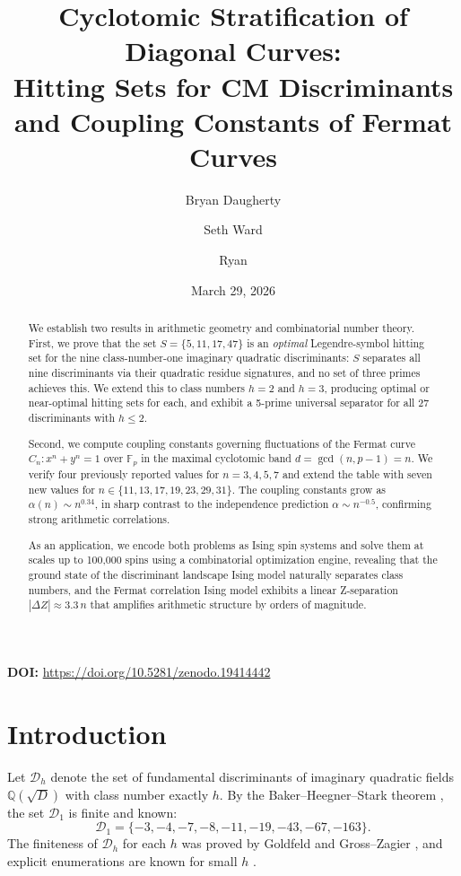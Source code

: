\documentclass[11pt]{amsart}
\title[Cyclotomic Stratification of Diagonal Curves]{Cyclotomic Stratification of Diagonal Curves:\\Hitting Sets for CM Discriminants and Coupling Constants of Fermat Curves}
\author{Bryan Daugherty}
\author{Seth Ward}
\author{Ryan}
\date{March 29, 2026}
\theoremstyle{definition}
\begin{document}
\begin{abstract}
We establish two results in arithmetic geometry and combinatorial number theory.
First, we prove that the set $S = \{5, 11, 17, 47\}$ is an \emph{optimal} Legendre-symbol hitting set for the nine class-number-one imaginary quadratic discriminants: $S$ separates all nine discriminants via their quadratic residue signatures, and no set of three primes achieves this. We extend this to class numbers $h = 2$ and $h = 3$, producing optimal or near-optimal hitting sets for each, and exhibit a 5-prime universal separator for all 27 discriminants with $h \leq 2$.

Second, we compute coupling constants governing fluctuations of the Fermat curve $C_n: x^n + y^n = 1$ over $\mathbb{F}_p$ in the maximal cyclotomic band $d = \gcd(n, p-1) = n$. We verify four previously reported values for $n = 3, 4, 5, 7$ and extend the table with seven new values for $n \in \{11, 13, 17, 19, 23, 29, 31\}$. The coupling constants grow as $\alpha(n) \sim n^{0.34}$, in sharp contrast to the independence prediction $\alpha \sim n^{-0.5}$, confirming strong arithmetic correlations.

As an application, we encode both problems as Ising spin systems and solve them at scales up to 100{,}000 spins using a combinatorial optimization engine, revealing that the ground state of the discriminant landscape Ising model naturally separates class numbers, and the Fermat correlation Ising model exhibits a linear Z-separation $|\Delta Z| \approx 3.3\,n$ that amplifies arithmetic structure by orders of magnitude.
\end{abstract}

\vspace{0.5em}
\noindent\textbf{DOI:} \url{https://doi.org/10.5281/zenodo.19414442}

\maketitle

\tableofcontents

\section{Introduction}
\label{sec:intro}

Let $\mathcal{D}_h$ denote the set of fundamental discriminants of imaginary quadratic fields $\mathbb{Q}(\sqrt{D})$ with class number exactly $h$. By the Baker--Heegner--Stark theorem \cite{baker1966,heegner1952,stark1967}, the set $\mathcal{D}_1$ is finite and known:
\[
\mathcal{D}_1 = \{-3, -4, -7, -8, -11, -19, -43, -67, -163\}.
\]
The finiteness of $\mathcal{D}_h$ for each $h$ was proved by Goldfeld \cite{goldfeld1976} and Gross--Zagier \cite{gross1986}, and explicit enumerations are known for small $h$ \cite{watkins2004}.
\end{document}
